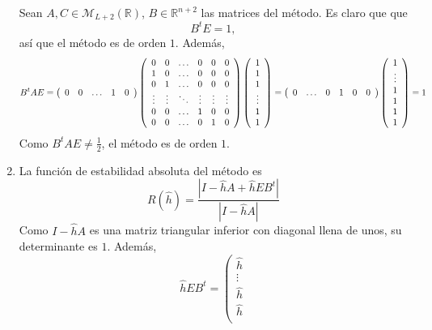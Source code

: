 \documentclass[11pt]{report}
\newcommand{\R}{\mathbb R}
\begin{document}
\begin{enumerate}
    Sean $A,C \in \mathcal{M}_{L+2}(\R)$, $B \in \R^{n+2}$ las matrices del método. Es claro que que
    \[B^tE= 1,\]
    así que el método es de orden $1$. Además,
    \[B^tAE = \left(\begin{array}{ccccc}
        0 & 0 & \mathellipsis & 1 & 0 
    \end{array}\right)\left(\begin{array}{cccccc}
        0 & 0  & \mathellipsis & 0 & 0 & 0 \\
        1 & 0  & \mathellipsis & 0 & 0 & 0 \\
        0 & 1  & \mathellipsis & 0 & 0 & 0 \\
        \vdots & \vdots & \ddots & \vdots & \vdots & \vdots \\
        0 & 0 &  \mathellipsis & 1 & 0 & 0 \\
        0 & 0 &  \mathellipsis & 0 & 1 & 0
    \end{array}\right)\left(\begin{array}{c}
        1 \\
        1 \\
        1 \\
        \vdots \\
        1 \\
        1
    \end{array}\right) = \left(\begin{array}{cccccc}
        0 & \mathellipsis & 0 & 1 & 0 & 0 
    \end{array}\right)\left(\begin{array}{c}
        1 \\
        \vdots \\
        1 \\
        1 \\
        1 \\
        1
    \end{array}\right) = 1\]
    Como $B^tAE \neq \frac{1}{2}$, el método es de orden $1$.
    \item La función de estabilidad absoluta del método es
    \[R(\hat{h}) = \frac{|I-\hat{h}A+\hat{h}EB^t|}{|I-\hat{h}A|}\]
    Como $I-\hat{h}A$ es una matriz triangular inferior con diagonal llena de unos, su determinante es $1$. Además,
    \[\hat{h}EB^t = \left(\begin{array}{c}
        \hat{h} \\
        \vdots \\
        \hat{h} \\
        \hat{h} \\

\end{array}\]
\end{enumerate}
\end{document}
